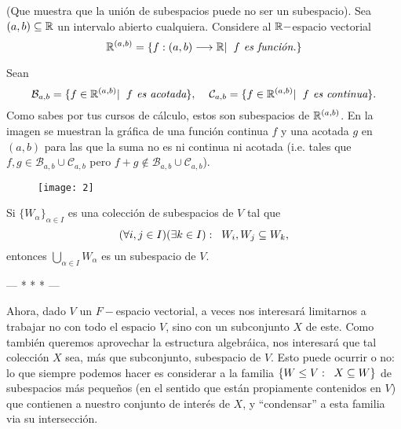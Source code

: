\begin{ejem}
(Que muestra que la unión de subespacios puede no ser un subespacio).
Sea $(a, b) \subseteq \mathbb{R}$ un intervalo abierto cualquiera.
Considere al $\mathbb{R}-$espacio vectorial
\[
\mathbb{R}^{(a, b)} = \{ f: (a, b) \longrightarrow
\mathbb{R}  | \hspace{0.2cm} f \textit{ es función.} \}
\]

Sean 
\[
\mathcal{B}_{a, b} = \{ f \in \mathbb{R}^{(a, b)}  | \hspace{0.2cm}
f \textit{ es acotada}  \}, \hspace{0.4cm}
\mathcal{C}_{a, b} = \{ f \in \mathbb{R}^{(a, b)}  | \hspace{0.2cm}
f \textit{ es continua}  \}.
\]
Como sabes por tus cursos de cálculo, estos son subespacios
de $\mathbb{R}^{(a, b)}$. En la imagen se muestran la gráfica
de una función continua $f$ y una acotada
$g$ en $(a, b)$ para las que la suma no es ni continua ni 
acotada (i.e. tales que $f, g \in \mathcal{B}_{a, b} \cup
\mathcal{C}_{a, b}$ pero $f + g \not\in \mathcal{B}_{a, b}
\cup \mathcal{C}_{a, b}$). 
\begin{figure}[H]
	\centering
	\texttt{[image: 2]} 
\end{figure}	
\diam
\end{ejem}

 Si $\{ W_{\alpha} \}_{\alpha \in I}$
es una colección de subespacios de $V$ tal que
\[
(\forall i, j \in I)(\exists k \in I): \hspace{0.2cm}
W_{i}, W_{j} \subseteq W_{k},
\]
entonces $\bigcup_{\alpha \in I} W_{\alpha}$ es un subespacio de $V$.


 \begin{center}
 --- * * * ---
 \end{center}
Ahora, dado $V$ un $F-$espacio vectorial, a veces nos interesará
limitarnos a trabajar no con todo el espacio $V$, sino con un 
subconjunto $X$ de este. Como también queremos aprovechar
la estructura algebráica, nos interesará que tal colección $X$
sea, más que subconjunto, subespacio de $V$.
Esto puede ocurrir o no: lo que siempre podemos hacer
es considerar a la familia $\{ W \leq V : 
\hspace{0.2cm} X \subseteq W \}$ de subespacios más pequeños
(en el sentido que están propiamente contenidos en $V$)
que contienen a nuestro conjunto de interés de $X$, y 
``condensar'' a esta familia via su intersección.


